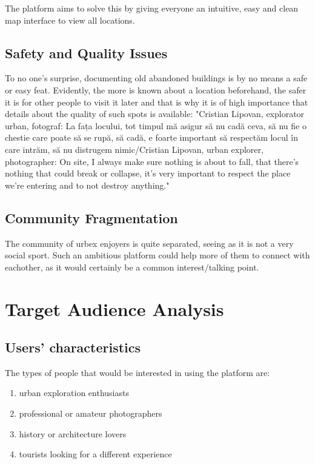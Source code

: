 \documentclass[12pt,a4paper]{report}
\begin{document}
The platform aims to solve this by giving everyone an intuitive, easy and clean map interface to view all locations.

\subsection{Safety and Quality Issues}
To no one's surprise, documenting old abandoned buildings is by no means a safe or easy feat. Evidently, the more is known about a location beforehand, the safer it is for other people to visit it later and that is why it is of high importance that details about the quality of such spots is available: "Cristian Lipovan, explorator urban, fotograf: La fața locului, tot timpul mă asigur să nu cadă ceva, să nu fie o chestie care poate să se rupă, să cadă, e foarte important să respectăm locul în care intrăm, să nu distrugem nimic/Cristian Lipovan, urban explorer, photographer: On site, I always make sure nothing is about to fall, that there's nothing that could break or collapse, it's very important to respect the place we're entering and to not destroy anything."~\cite{articleUrbexInformation}

\subsection{Community Fragmentation}
The community of urbex enjoyers is quite separated, seeing as it is not a very social sport. Such an ambitious platform could help more of them to connect with eachother, as it would certainly be a common interest/talking point.

\section{Target Audience Analysis}
\subsection{Users' characteristics}
The types of people that would be interested in using the platform are:
\begin{enumerate}
    \item urban exploration enthusiasts
    \item professional or amateur photographers
    \item history or architecture lovers
    \item tourists looking for a different experience
\end{enumerate}
\end{document}

